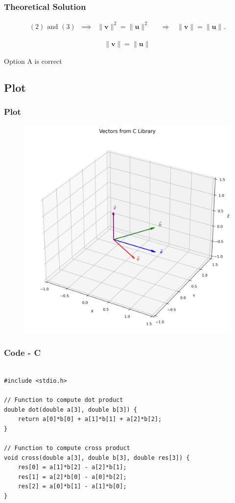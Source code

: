 \documentclass{beamer}
\theoremstyle{remark}
\let\vec\mathbf
\numberwithin{equation}{section}
\begin{document}
\begin{frame}
\frametitle{Theoretical Solution}

\begin{align}
(2) \text{ and } (3) \;\;\implies\;\;
\|\vec{v}\|^2 = \|\vec{u}\|^2 
&\;\;\;\Rightarrow\;\;\; 
\|\vec{v}\| = \|\vec{u}\|.
\end{align}

\begin{align}
\boxed{\|\vec{v}\| = \|\vec{u}\|}
\end{align}

Option A is correct



\end{frame}

\subsection{Plot}
\begin{frame}
    \frametitle{Plot}
\begin{figure}[H]
   \centering
   \includegraphics[width=0.6\columnwidth]{figs/vector_plot.png}
   \end{figure}
\end{frame}

\begin{frame}[fragile]
    \frametitle{Code - C}
    \begin{lstlisting}

#include <stdio.h>

// Function to compute dot product
double dot(double a[3], double b[3]) {
    return a[0]*b[0] + a[1]*b[1] + a[2]*b[2];
}

// Function to compute cross product
void cross(double a[3], double b[3], double res[3]) {
    res[0] = a[1]*b[2] - a[2]*b[1];
    res[1] = a[2]*b[0] - a[0]*b[2];
    res[2] = a[0]*b[1] - a[1]*b[0];
}
\end{lstlisting}
\end{frame}
\end{document}
